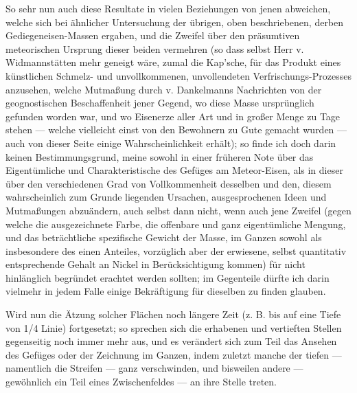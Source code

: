 \documentclass[a4paper, 11pt, oneside, german]{article}
\begin{document}
{So sehr nun auch diese Resultate in vielen Beziehungen von jenen abweichen, welche sich bei ähnlicher Untersuchung der übrigen, oben beschriebenen, derben Gediegeneisen-Massen ergaben, und die Zweifel über den präsumtiven meteorischen Ursprung dieser beiden vermehren (so dass selbst Herr v. Widmannstätten mehr geneigt wäre, zumal die Kap'sche, für das Produkt eines künstlichen Schmelz- und unvollkommenen, unvollendeten Verfrischungs-Prozesses anzusehen, welche Mutmaßung durch v. Dankelmanns Nachrichten von der geognostischen Beschaffenheit jener Gegend, wo diese Masse ursprünglich gefunden worden war, und wo Eisenerze aller Art und in großer Menge zu Tage stehen --- welche vielleicht einst von den Bewohnern zu Gute gemacht wurden --- auch von dieser Seite einige Wahrscheinlichkeit erhält); so finde ich doch darin keinen Bestimmungsgrund, meine sowohl in einer früheren Note über das Eigentümliche und Charakteristische des Gefüges am Meteor-Eisen, als in dieser über den verschiedenen Grad von Vollkommenheit desselben und den, diesem wahrscheinlich zum Grunde liegenden Ursachen, ausgesprochenen Ideen und Mutmaßungen abzuändern, auch selbst dann nicht, wenn auch jene Zweifel (gegen welche die ausgezeichnete Farbe, die offenbare und ganz eigentümliche Mengung, und das beträchtliche spezifische Gewicht der Masse, im Ganzen sowohl als insbesondere des einen Anteiles, vorzüglich aber der erwiesene, selbst quantitativ entsprechende Gehalt an Nickel in Berücksichtigung kommen) für nicht hinlänglich begründet erachtet werden sollten; im Gegenteile dürfte ich darin vielmehr in jedem Falle einige Bekräftigung für dieselben zu finden glauben.}

Wird nun die Ätzung solcher Flächen noch längere Zeit (z. B. bis auf eine Tiefe von 1/4 Linie) fortgesetzt; so sprechen sich die erhabenen und vertieften Stellen gegenseitig noch immer mehr aus, und es verändert sich zum Teil das Ansehen des Gefüges oder der Zeichnung im Ganzen, indem zuletzt manche der tiefen --- namentlich die Streifen --- ganz verschwinden, und bisweilen andere --- gewöhnlich ein Teil eines Zwischenfeldes --- an ihre Stelle treten.
\end{document}
